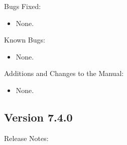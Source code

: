 \noindent Bugs Fixed:

\begin{itemize}

\item None.

\end{itemize}

\noindent Known Bugs:

\begin{itemize}

\item None.

\end{itemize}

\noindent Additions and Changes to the Manual:

\begin{itemize}

\item None.

\end{itemize}


\subsection*{\label{sec:New-7-4-0}Version 7.4.0}

\noindent Release Notes:

